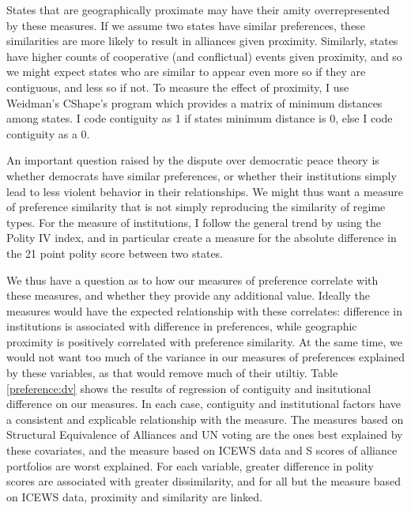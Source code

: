 \documentclass[12pt,onesided,fullpage]{amsart}
\begin{document}
States that are geographically proximate may have their amity overrepresented by these measures. If we assume two states have similar preferences, these similarities are more likely to result in alliances given proximity. Similarly, states have higher counts of cooperative (and conflictual) events given proximity, and so we might expect states who are similar to appear even more so if they are contiguous, and less so if not. To measure the effect of proximity, I use Weidman's CShape's program which provides a matrix of minimum distances among states. I code contiguity as 1 if states minimum distance is 0, else I code contiguity as a 0.

An important question raised by the dispute over democratic peace theory is whether democrats have similar preferences, or whether their institutions simply lead to less violent behavior in their relationships. We might thus want a measure of preference similarity that is not simply reproducing the similarity of regime types. For the measure of institutions, I follow the general trend by using the Polity IV index, and in particular create a measure for the absolute difference in the 21 point polity score between two states.

We thus have a question as to how our measures of preference correlate with these measures, and whether they provide any additional value. Ideally the measures would have the expected relationship with these correlates: difference in institutions is associated with difference in preferences, while geographic proximity is positively correlated with preference similarity. At the same time, we would not want too much of the variance in our measures of preferences explained by these variables, as that would remove much of their utiltiy. Table \ref{preference:dv} shows the results of regression of contiguity and insitutional difference on our measures. In each case, contiguity and institutional factors have a consistent and explicable relationship with the measure. The measures based on Structural Equivalence of Alliances and UN voting are the ones best explained by these covariates, and the measure based on ICEWS data and S scores of alliance portfolios are worst explained. For each variable,  greater difference in polity scores are associated with greater dissimilarity, and for all but the measure based on ICEWS data, proximity and similarity are linked. 
\end{document}

